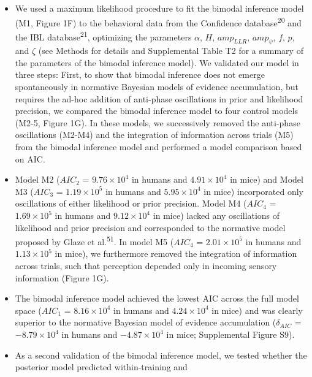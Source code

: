 \documentclass[
]{article}
\begin{document}
\begin{itemize}
\item
  We used a maximum likelihood procedure to fit the bimodal inference
  model (M1, Figure 1F) to the behavioral data from the Confidence
  database\textsuperscript{20} and the IBL database\textsuperscript{21},
  optimizing the parameters \(\alpha\), \(H\), \(amp_{LLR}\),
  \(amp_{\psi}\), \(f\), \(p\), and \(\zeta\) (see Methods for details
  and Supplemental Table T2 for a summary of the parameters of the
  bimodal inference model). We validated our model in three steps:
  First, to show that bimodal inference does not emerge spontaneously in
  normative Bayesian models of evidence accumulation, but requires the
  ad-hoc addition of anti-phase oscillations in prior and likelihood
  precision, we compared the bimodal inference model to four control
  models (M2-5, Figure 1G). In these models, we successively removed the
  anti-phase oscillations (M2-M4) and the integration of information
  across trials (M5) from the bimodal inference model and performed a
  model comparison based on AIC.
\item
  Model M2 (\(AIC_2\) = \(\ensuremath{9.76\times 10^{4}}\) in humans and
  \(\ensuremath{4.91\times 10^{4}}\) in mice) and Model M3 (\(AIC_3\) =
  \(\ensuremath{1.19\times 10^{5}}\) in humans and
  \(\ensuremath{5.95\times 10^{4}}\) in mice) incorporated only
  oscillations of either likelihood or prior precision. Model M4
  (\(AIC_4\) = \(\ensuremath{1.69\times 10^{5}}\) in humans and
  \(\ensuremath{9.12\times 10^{4}}\) in mice) lacked any oscillations of
  likelihood and prior precision and corresponded to the normative model
  proposed by Glaze et al.\textsuperscript{51}. In model M5 (\(AIC_4\) =
  \(\ensuremath{2.01\times 10^{5}}\) in humans and
  \(\ensuremath{1.13\times 10^{5}}\) in mice), we furthermore removed
  the integration of information across trials, such that perception
  depended only in incoming sensory information (Figure 1G).
\item
  The bimodal inference model achieved the lowest AIC across the full
  model space (\(AIC_1\) = \(\ensuremath{8.16\times 10^{4}}\) in humans
  and \(\ensuremath{4.24\times 10^{4}}\) in mice) and was clearly
  superior to the normative Bayesian model of evidence accumulation
  (\(\delta_{AIC}\) = \(\ensuremath{-8.79\times 10^{4}}\) in humans and
  \(\ensuremath{-4.87\times 10^{4}}\) in mice; Supplemental Figure S9).
\item
  As a second validation of the bimodal inference model, we tested
  whether the posterior model predicted within-training and

\end{itemize}
\end{document}
